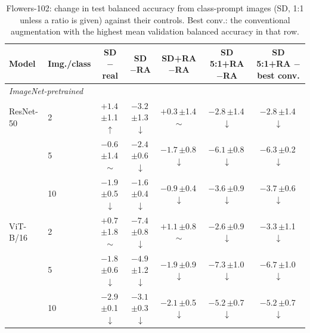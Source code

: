 \begin{table}[htbp]
\centering
\footnotesize
\setlength{\tabcolsep}{4pt}
\caption{Flowers-102: change in test balanced accuracy from class-prompt images (SD, 1:1 unless a ratio is given) against their controls. Best conv.: the conventional augmentation with the highest mean validation balanced accuracy in that row.}
\label{tab:paper-flowers102-sd}
\begin{tabular}{llccccc}
\toprule
Model & Img./class & \shortstack{SD\\$-$real} & \shortstack{SD\\$-$RA} & \shortstack{SD+RA\\$-$RA} & \shortstack{SD 5:1+RA\\$-$RA} & \shortstack{SD 5:1+RA\\$-$best conv.} \\
\midrule
\multicolumn{7}{l}{\textit{ImageNet-pretrained}} \\
ResNet-50 & 2 & $+1.4$\,{\scriptsize$\pm$1.1}\,$\uparrow$ & $-3.2$\,{\scriptsize$\pm$1.3}\,$\downarrow$ & $+0.3$\,{\scriptsize$\pm$1.4}\,$\sim$ & $-2.8$\,{\scriptsize$\pm$1.4}\,$\downarrow$ & $-2.8$\,{\scriptsize$\pm$1.4}\,$\downarrow$ \\
 & 5 & $-0.6$\,{\scriptsize$\pm$1.4}\,$\sim$ & $-2.4$\,{\scriptsize$\pm$0.6}\,$\downarrow$ & $-1.7$\,{\scriptsize$\pm$0.8}\,$\downarrow$ & $-6.1$\,{\scriptsize$\pm$0.8}\,$\downarrow$ & $-6.3$\,{\scriptsize$\pm$0.2}\,$\downarrow$ \\
 & 10 & $-1.9$\,{\scriptsize$\pm$0.5}\,$\downarrow$ & $-1.6$\,{\scriptsize$\pm$0.4}\,$\downarrow$ & $-0.9$\,{\scriptsize$\pm$0.4}\,$\downarrow$ & $-3.6$\,{\scriptsize$\pm$0.9}\,$\downarrow$ & $-3.7$\,{\scriptsize$\pm$0.6}\,$\downarrow$ \\
\addlinespace[2pt]
ViT-B/16 & 2 & $+0.7$\,{\scriptsize$\pm$1.8}\,$\sim$ & $-7.4$\,{\scriptsize$\pm$0.8}\,$\downarrow$ & $+1.1$\,{\scriptsize$\pm$0.8}\,$\sim$ & $-2.6$\,{\scriptsize$\pm$0.9}\,$\downarrow$ & $-3.3$\,{\scriptsize$\pm$1.1}\,$\downarrow$ \\
 & 5 & $-1.8$\,{\scriptsize$\pm$0.6}\,$\downarrow$ & $-4.9$\,{\scriptsize$\pm$1.2}\,$\downarrow$ & $-1.9$\,{\scriptsize$\pm$0.9}\,$\downarrow$ & $-7.3$\,{\scriptsize$\pm$1.0}\,$\downarrow$ & $-6.7$\,{\scriptsize$\pm$1.0}\,$\downarrow$ \\
 & 10 & $-2.9$\,{\scriptsize$\pm$0.1}\,$\downarrow$ & $-3.1$\,{\scriptsize$\pm$0.3}\,$\downarrow$ & $-2.1$\,{\scriptsize$\pm$0.5}\,$\downarrow$ & $-5.2$\,{\scriptsize$\pm$0.7}\,$\downarrow$ & $-5.2$\,{\scriptsize$\pm$0.7}\,$\downarrow$ \\

\end{tabular}
\end{table}
